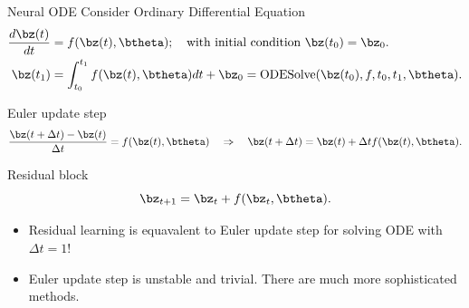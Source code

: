 \begin{frame}{Neural ODE}
	Consider Ordinary Differential Equation    
	\begin{align*}
	    \frac{d \bz(t)}{dt} &= f(\bz(t), \btheta); \quad \text{with initial condition }\bz(t_0) = \bz_0. \\
	    \bz(t_1) &= \int^{t_1}_{t_0} f(\bz(t), \btheta) d t  + \bz_0 = \text{ODESolve}(\bz(t_0), f, t_0,t_1, \btheta).
	\end{align*}
	\vspace{-0.4cm}
	\begin{block}{Euler update step}
		\vspace{-0.4cm}
		\[
		    \frac{\bz(t + \Delta t) - \bz(t)}{\Delta t} = f(\bz(t), \btheta) \quad \Rightarrow \quad \bz(t + \Delta t) = \bz(t) + \Delta t f(\bz(t), \btheta).
		\]
		\vspace{-0.5cm}
	\end{block}
	\begin{block}{Residual block}
		\vspace{-0.5cm}
		\[
		    \bz_{t+1} = \bz_t + f(\bz_t, \btheta).
		\]
		\vspace{-0.4cm}
	\end{block}
	\begin{itemize}
	 \item Residual learning is equavalent to Euler update step for solving ODE with $\Delta t = 1$!
	 \item Euler update step is unstable and trivial. There are much more sophisticated methods.
	\end{itemize}

\end{frame}
